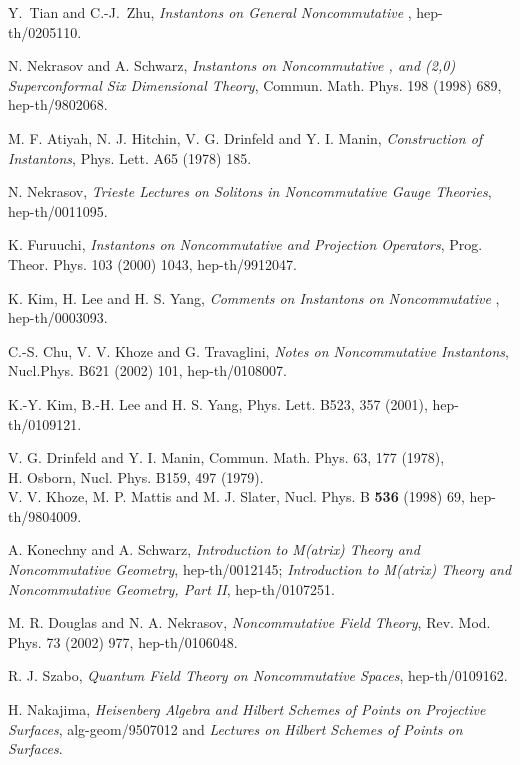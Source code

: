 \documentclass[a4paper,a4paper]{article}
\begin{document}
\begin{thebibliography}{99}

 Y.~Tian and C.-J.~Zhu, {\it Instantons on
General Noncommutative \coordHE{}}, hep-th/0205110.

 N. Nekrasov and A. Schwarz, {\it Instantons on
Noncommutative \coordHE{}, and (2,0) Superconformal Six Dimensional
Theory}, Commun. Math. Phys. 198 (1998) 689, hep-th/9802068.

 M. F. Atiyah, N. J. Hitchin, V. G. Drinfeld and Y.
I. Manin, {\it Construction of Instantons}, Phys. Lett. A65 (1978)
185.

 N. Nekrasov, {\it Trieste Lectures on Solitons in
Noncommutative Gauge Theories}, hep-th/0011095.

 K. Furuuchi, {\it Instantons on Noncommutative
\coordHE{} and Projection Operators}, Prog. Theor. Phys. 103 (2000)
1043, hep-th/9912047.

 K. Kim, H. Lee and H. S. Yang, {\it Comments on
Instantons on Noncommutative \coordHE{}}, hep-th/0003093.

 C.-S. Chu, V. V. Khoze and G. Travaglini, {\it
Notes on Noncommutative Instantons}, Nucl.Phys. B621 (2002) 101,
hep-th/0108007.

 K.-Y. Kim, B.-H. Lee and H. S. Yang, Phys.
Lett. B523, 357 (2001), hep-th/0109121.

 V. G. Drinfeld and Y. I. Manin, Commun. Math. Phys. 63, 177 (1978),\\
H. Osborn, Nucl. Phys. B159, 497 (1979).\\
V. V. Khoze, M. P. Mattis and M. J. Slater, Nucl. Phys. B {\bf
536} (1998) 69, hep-th/9804009.

 A. Konechny and A. Schwarz, {\it Introduction to
M(atrix) Theory and Noncommutative Geometry}, hep-th/0012145; {\it
Introduction to M(atrix) Theory and Noncommutative Geometry, Part
II}, hep-th/0107251.

 M. R. Douglas and N. A. Nekrasov, {\it
Noncommutative Field Theory}, Rev. Mod. Phys. 73 (2002) 977,
hep-th/0106048.

 R. J. Szabo, {\it Quantum Field Theory on
Noncommutative Spaces}, hep-th/0109162.

 H. Nakajima, {\it Heisenberg Algebra and Hilbert
Schemes of Points on Projective Surfaces}, alg-geom/9507012 and
{\it Lectures on Hilbert Schemes of Points on Surfaces}.


\end{thebibliography}
\end{document}
